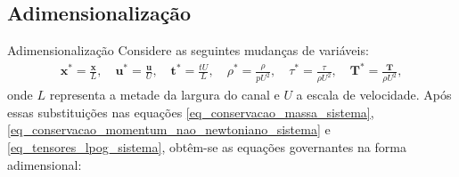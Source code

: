 \subsection{Adimensionalização}

\begin{frame}{Adimensionalização}
Considere as seguintes mudanças de variáveis:
\begin{align*}
    \mathbf{x}^*=\frac{\mathbf{x}}{L},\quad \mathbf{u}^*=\frac{\mathbf{u}}{U},\quad \mathbf{t}^*=\frac{t U}{L},\quad \rho^*=\frac{\rho}{p U^2},\quad \tau^*=\frac{\tau}{\rho U^2},\quad \mathbf{T}^*=\frac{\mathbf{T}}{\rho U^2},
\end{align*}
onde $L$ representa a metade da largura do canal e $U$ a escala de velocidade. Após essas substituições nas equações \eqref{eq_conservacao_massa_sistema}, \eqref{eq_conservacao_momentum_nao_newtoniano_sistema} e \eqref{eq_tensores_lpog_sistema}, obtêm-se as equações governantes na forma adimensional:
\end{frame}

